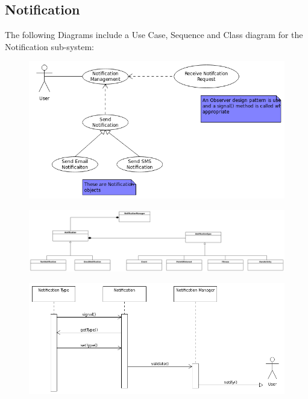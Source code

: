 \documentclass{article}
\begin{document}
	\subsection{Notification}
	The following Diagrams include a Use Case, Sequence and Class diagram for the Notification sub-system:
	\begin{figure}[h]
  		\includegraphics[width=\textwidth]{Images/NotificationUseCase.png}
	\end{figure}
	\begin{figure}[h]
  		\includegraphics[width=\textwidth]{Images/NotificationClass.png}
	\end{figure}
	\begin{figure}[h]
  		\includegraphics[width=\textwidth]{Images/NotificationSequence.png}
	\end{figure}
	
\end{document}
